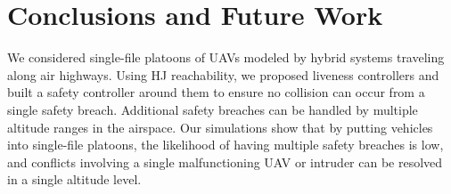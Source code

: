 \section{Conclusions and Future Work}
We considered single-file platoons of UAVs modeled by hybrid systems traveling along air highways. Using HJ reachability, we proposed liveness controllers and built a safety controller around them to ensure no collision can occur from a single safety breach. Additional safety breaches can be handled by multiple altitude ranges in the airspace. Our simulations show that by putting vehicles into single-file platoons, the likelihood of having multiple safety breaches is low, and conflicts involving a single malfunctioning UAV or intruder can be resolved in a single altitude level.